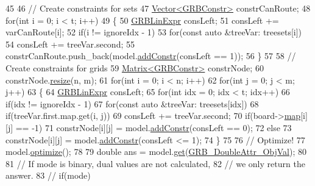 \begin{DoxyCode}
45     
46     \textcolor{comment}{// Create constraints for sets}
47     \hyperlink{classVector}{Vector<GRBConstr>} constrCanRoute;
48     \textcolor{keywordflow}{for}(\textcolor{keywordtype}{int} i = 0; i < t; i++)
49     \{
50         \hyperlink{classGRBLinExpr}{GRBLinExpr} consLeft;
51         consLeft += varCanRoute[i];
52         \textcolor{keywordflow}{if}(i != ignoreIdx - 1)
53             \textcolor{keywordflow}{for}(\textcolor{keyword}{const} \textcolor{keyword}{auto} &treeVar: treesets[i])
54                 consLeft += treeVar.second;
55         constrCanRoute.push\_back(model.\hyperlink{classGRBModel_a95e9bc35355e800ebdf87ba618153d27}{addConstr}(consLeft == 1));
56     \}
57     
58     \textcolor{comment}{// Create constraints for grids}
59     \hyperlink{classMatrix}{Matrix<GRBConstr>} constrNode;
60     constrNode.\hyperlink{classMatrix_a15ce96c8af4c7a982c2c10b96f29cea1}{resize}(n, m);
61     \textcolor{keywordflow}{for}(\textcolor{keywordtype}{int} i = 0; i < n; i++)
62         \textcolor{keywordflow}{for}(\textcolor{keywordtype}{int} j = 0; j < m; j++)
63         \{
64             \hyperlink{classGRBLinExpr}{GRBLinExpr} consLeft;
65             \textcolor{keywordflow}{for}(\textcolor{keywordtype}{int} idx = 0; idx < t; idx++)
66                 \textcolor{keywordflow}{if}(idx != ignoreIdx - 1)
67                     \textcolor{keywordflow}{for}(\textcolor{keyword}{const} \textcolor{keyword}{auto} &treeVar: treesets[idx])
68                         \textcolor{keywordflow}{if}(treeVar.first.map.get(i, j))
69                             consLeft += treeVar.second;
70             \textcolor{keywordflow}{if}(board->\hyperlink{classBoard_a191ff45df9151b8fee0c32877f582165}{map}[i][j] == -1)
71                 constrNode[i][j] = model.\hyperlink{classGRBModel_a95e9bc35355e800ebdf87ba618153d27}{addConstr}(consLeft == 0);
72             \textcolor{keywordflow}{else}
73                 constrNode[i][j] = model.\hyperlink{classGRBModel_a95e9bc35355e800ebdf87ba618153d27}{addConstr}(consLeft <= 1);
74         \}
75     
76     \textcolor{comment}{// Optimize!}
77     model.\hyperlink{classGRBModel_a261ee3d0ea71fe57fd484d3c93e4388d}{optimize}();
78     
79     \textcolor{keywordtype}{double} ans = model.\hyperlink{classGRBModel_a8fe021a9f145ee918ab1a7a1b326aa20}{get}(\hyperlink{gurobi__c_09_09_8h_a2f43cc28447ce1778973a1f7961e8180a4a9cfc64b93ee8a035ab4f23104d8641}{GRB\_DoubleAttr\_ObjVal});
80     
81     \textcolor{comment}{// If mode is binary, dual values are not calculated,}
82     \textcolor{comment}{// we only return the answer.}
83     \textcolor{comment}{// if(mode)}

\end{DoxyCode}
